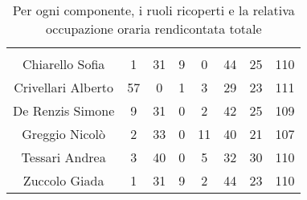 \begin{table}[H]
	\begin{center}
		\begin{tabular}{c
				!{\color[HTML]{9b240a}\vrule width 1pt}
				cccccc
				!{\color[HTML]{9b240a}\vrule width 1pt}	
				c}
			\rowcolorhead
			 &  &  &  &  &  &  &  \\
			
			Chiarello Sofia & 1 & 31 & 9 & 0 & 44 & 25 & 110\\
			Crivellari Alberto & 57 & 0 & 1 & 3 & 29 & 23 & 111\\
			De Renzis Simone & 9 & 31 & 0 & 2 & 42 & 25 & 109\\
			Greggio Nicolò & 2 & 33 & 0 & 11 & 40 & 21 & 107\\
			Tessari Andrea & 3 & 40 & 0 & 5 & 32 & 30 & 110\\
			Zuccolo Giada & 1 & 31 & 9 & 2 & 44 & 23 & 110\\
		\end{tabular}
		\caption[Occupazione oraria totale rendicontata]{Per ogni componente, i ruoli ricoperti e la relativa occupazione oraria rendicontata totale}
	\end{center}
\end{table}


